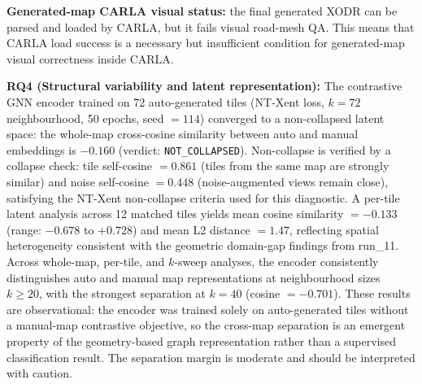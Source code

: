 \textbf{Generated-map CARLA visual status:} the final generated XODR can be parsed and loaded by CARLA, but it fails visual road-mesh QA. This means that CARLA load success is a necessary but insufficient condition for generated-map visual correctness inside CARLA.

\textbf{RQ4 (Structural variability and latent representation):} The contrastive GNN encoder trained on 72 auto-generated tiles (NT-Xent loss, $k=72$ neighbourhood, 50 epochs, seed $=114$) converged to a non-collapsed latent space: the whole-map cross-cosine similarity between auto and manual embeddings is $-0.160$ (verdict: \texttt{NOT\_COLLAPSED}). Non-collapse is verified by a collapse check: tile self-cosine $=0.861$ (tiles from the same map are strongly similar) and noise self-cosine $=0.448$ (noise-augmented views remain close), satisfying the NT-Xent non-collapse criteria used for this diagnostic. A per-tile latent analysis across 12 matched tiles yields mean cosine similarity $=-0.133$ (range: $-0.678$ to $+0.728$) and mean L2 distance $=1.47$, reflecting spatial heterogeneity consistent with the geometric domain-gap findings from run\_11. Across whole-map, per-tile, and $k$-sweep analyses, the encoder consistently distinguishes auto and manual map representations at neighbourhood sizes $k \geq 20$, with the strongest separation at $k=40$ (cosine $=-0.701$). These results are observational: the encoder was trained solely on auto-generated tiles without a manual-map contrastive objective, so the cross-map separation is an emergent property of the geometry-based graph representation rather than a supervised classification result. The separation margin is moderate and should be interpreted with caution.

